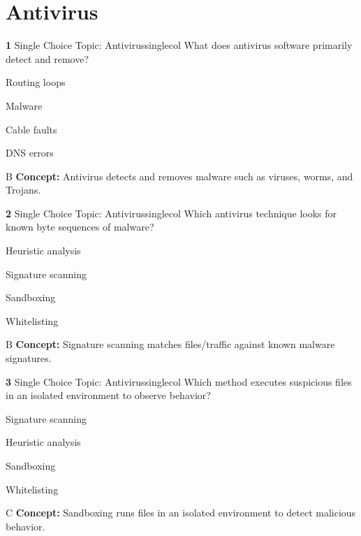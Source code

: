 \documentclass[10pt,a4paper]{article}
\begin{document}
\section{Antivirus}
\begin{qcard}{\color{white}\textbf{1} \hfill \small Single Choice \textbar{} Topic: Antivirus}{singlecol}
What does antivirus software primarily detect and remove?

\begin{qoptions}
\item Routing loops
\item Malware
\item Cable faults
\item DNS errors
\end{qoptions}
\begin{explainbox}{B}
\textbf{Concept:} Antivirus detects and removes malware such as viruses, worms, and Trojans.
\end{explainbox}
\end{qcard}

\begin{qcard}{\color{white}\textbf{2} \hfill \small Single Choice \textbar{} Topic: Antivirus}{singlecol}
Which antivirus technique looks for known byte sequences of malware?

\begin{qoptions}
\item Heuristic analysis
\item Signature scanning
\item Sandboxing
\item Whitelisting
\end{qoptions}
\begin{explainbox}{B}
\textbf{Concept:} Signature scanning matches files/traffic against known malware signatures.
\end{explainbox}
\end{qcard}

\begin{qcard}{\color{white}\textbf{3} \hfill \small Single Choice \textbar{} Topic: Antivirus}{singlecol}
Which method executes suspicious files in an isolated environment to observe behavior?

\begin{qoptions}
\item Signature scanning
\item Heuristic analysis
\item Sandboxing
\item Whitelisting
\end{qoptions}
\begin{explainbox}{C}
\textbf{Concept:} Sandboxing runs files in an isolated environment to detect malicious behavior.
\end{explainbox}
\end{qcard}
\end{document}

